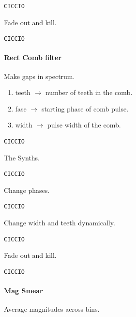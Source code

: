 \begin{lstlisting}[frame=single] 
CICCIO
\end{lstlisting}

Fade out and kill.

\begin{lstlisting}[frame=single] 
CICCIO
\end{lstlisting}

\paragraph{Rect Comb filter}\label{rect-comb-filter}

Make gaps in spectrum.

\begin{enumerate}
\tightlist 
\item teeth \(\rightarrow\) number of teeth in the comb. 
\item fase \(\rightarrow\) starting phase of comb pulse. 
\item width \(\rightarrow\) pulse width of the comb.
\end{enumerate}

\begin{lstlisting}[frame=single] 
CICCIO
\end{lstlisting}

The Synths.

\begin{lstlisting}[frame=single] 
CICCIO
\end{lstlisting}

Change phases.

\begin{lstlisting}[frame=single] 
CICCIO
\end{lstlisting}

Change width and teeth dynamically.

\begin{lstlisting}[frame=single] 
CICCIO
\end{lstlisting}

Fade out and kill.

\begin{lstlisting}[frame=single] 
CICCIO
\end{lstlisting}

\paragraph{Mag Smear}\label{mag-smear}

Average magnitudes across bins.

